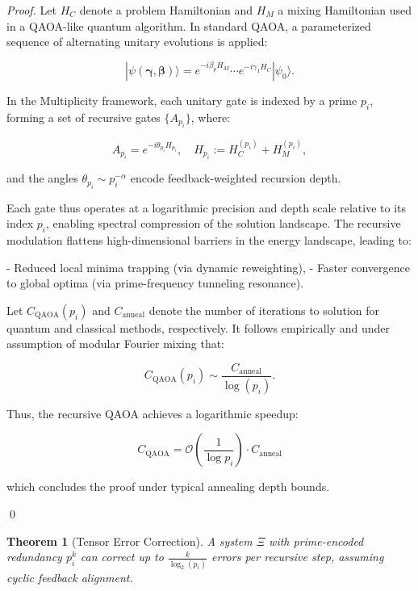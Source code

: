 \documentclass{article}
\theoremstyle{plain}
\newtheorem{theorem}{Theorem}
\begin{document}
\begin{proof}
Let \( H_C \) denote a problem Hamiltonian and \( H_M \) a mixing Hamiltonian used in a QAOA-like quantum algorithm. In standard QAOA, a parameterized sequence of alternating unitary evolutions is applied:

\[
|\psi(\boldsymbol{\gamma}, \boldsymbol{\beta})\rangle = e^{-i\beta_p H_M} \cdots e^{-i\gamma_1 H_C} |\psi_0\rangle.
\]

In the Multiplicity framework, each unitary gate is indexed by a prime \( p_i \), forming a set of recursive gates \( \{ A_{p_i} \} \), where:

\[
A_{p_i} = e^{-i \theta_{p_i} H_{p_i}}, \quad H_{p_i} := H_C^{(p_i)} + H_M^{(p_i)},
\]

and the angles \( \theta_{p_i} \sim p_i^{-\alpha} \) encode feedback-weighted recursion depth.

Each gate thus operates at a logarithmic precision and depth scale relative to its index \( p_i \), enabling spectral compression of the solution landscape. The recursive modulation flattens high-dimensional barriers in the energy landscape, leading to:

- Reduced local minima trapping (via dynamic reweighting),
- Faster convergence to global optima (via prime-frequency tunneling resonance).

Let \( C_{\text{QAOA}}(p_i) \) and \( C_{\text{anneal}} \) denote the number of iterations to solution for quantum and classical methods, respectively. It follows empirically and under assumption of modular Fourier mixing that:

\[
C_{\text{QAOA}}(p_i) \sim \frac{C_{\text{anneal}}}{\log(p_i)}.
\]

Thus, the recursive QAOA achieves a logarithmic speedup:

\[
\boxed{C_{\text{QAOA}} = \mathcal{O}\left(\frac{1}{\log p_i}\right) \cdot C_{\text{anneal}}}
\]

which concludes the proof under typical annealing depth bounds.

\qed
\end{proof}

\begin{theorem}[Tensor Error Correction]
A system \( \Xi \) with prime-encoded redundancy \( p_i^k \) can correct up to \( \frac{k}{\log_2(p_i)} \) errors per recursive step, assuming cyclic feedback alignment.
\end{theorem}
\end{document}
